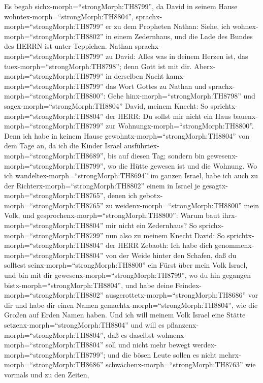  Es begab sichx-morph=``strongMorph:TH8799'', da David in
seinem Hause wohntex-morph=``strongMorph:TH8804'',
sprachx-morph=``strongMorph:TH8799'' er zu dem Propheten Nathan: Siehe,
ich wohnex-morph=``strongMorph:TH8802'' in einem Zedernhaus, und die
Lade des Bundes des HERRN ist unter Teppichen.  Nathan
sprachx-morph=``strongMorph:TH8799'' zu David: Alles was in deinem
Herzen ist, das tuex-morph=``strongMorph:TH8798''; denn Gott ist mit
dir.  Aberx-morph=``strongMorph:TH8799'' in derselben Nacht
kamx-morph=``strongMorph:TH8799'' das Wort Gottes zu Nathan und
sprachx-morph=``strongMorph:TH8800'':  Gehe
hinx-morph=``strongMorph:TH8798'' und sagex-morph=``strongMorph:TH8804''
David, meinem Knecht: So sprichtx-morph=``strongMorph:TH8804'' der HERR:
Du sollst mir nicht ein Haus bauenx-morph=``strongMorph:TH8799'' zur
Wohnungx-morph=``strongMorph:TH8800''.  Denn ich habe in
keinem Hause gewohntx-morph=``strongMorph:TH8804'' von dem Tage an, da
ich die Kinder Israel ausführtex-morph=``strongMorph:TH8689'', bis auf
diesen Tag; sondern bin gewesenx-morph=``strongMorph:TH8799'', wo die
Hütte gewesen ist und die Wohnung.  Wo ich
wandeltex-morph=``strongMorph:TH8694'' im ganzen Israel, habe ich auch
zu der Richterx-morph=``strongMorph:TH8802'' einem in Israel je
gesagtx-morph=``strongMorph:TH8765'', denen ich
gebotx-morph=``strongMorph:TH8765'' zu
weidenx-morph=``strongMorph:TH8800'' mein Volk, und
gesprochenx-morph=``strongMorph:TH8800'': Warum baut
ihrx-morph=``strongMorph:TH8804'' mir nicht ein Zedernhaus? 
So sprichx-morph=``strongMorph:TH8799'' nun also zu meinem Knecht David:
So sprichtx-morph=``strongMorph:TH8804'' der HERR Zebaoth: Ich habe dich
genommenx-morph=``strongMorph:TH8804'' von der Weide hinter den Schafen,
daß du solltest seinx-morph=``strongMorph:TH8800'' ein Fürst über mein
Volk Israel,  und bin mit dir
gewesenx-morph=``strongMorph:TH8799'', wo du hin gegangen
bistx-morph=``strongMorph:TH8804'', und habe deine
Feindex-morph=``strongMorph:TH8802''
ausgerottetx-morph=``strongMorph:TH8686'' vor dir und habe dir einen
Namen gemachtx-morph=``strongMorph:TH8804'', wie die Großen auf Erden
Namen haben.  Und ich will meinem Volk Israel eine Stätte
setzenx-morph=``strongMorph:TH8804'' und will es
pflanzenx-morph=``strongMorph:TH8804'', daß es daselbst
wohnenx-morph=``strongMorph:TH8804'' soll und nicht mehr bewegt
werdex-morph=``strongMorph:TH8799''; und die bösen Leute sollen es nicht
mehrx-morph=``strongMorph:TH8686''
schwächenx-morph=``strongMorph:TH8763'' wie vormals und zu den Zeiten,
